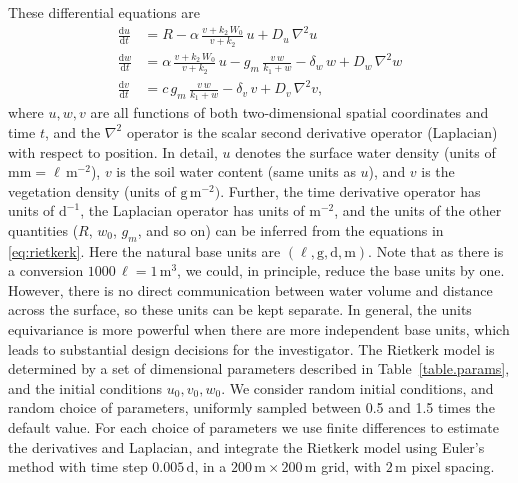 \documentclass[twoside,11pt]{article}
\newcommand{\dd}{\mathrm{d}}
\newcommand{\unit}[1]{\mathrm{#1}}
\newcommand{\g}{\unit{g}}
\newcommand{\m}{\unit{m}}
\newcommand{\mm}{\unit{mm}}
\renewcommand{\l}{\unit{\ell}}
\renewcommand{\d}{\unit{d}}
\begin{document}
These differential equations are
\begin{align}\label{eq:rietkerk}
    \frac{\dd u}{\dd t} &= R - \alpha\,\frac{v + k_2\,W_0}{v + k_2}\,u + D_u\,\nabla^2 u\nonumber\\
    \frac{\dd w}{\dd t} &= \alpha\,\frac{v + k_2\,W_0}{v + k_2}\,u - g_m\,\frac{v\,w}{k_1 + w} - \delta_w\,w + D_w\,\nabla^2 w\nonumber\\
    \frac{\dd v}{\dd t} &= c\,g_m\,\frac{v\,w}{k_1 + w} - \delta_v\,v + D_v\,\nabla^2 v,
\end{align}
where $u,w,v$ are all functions of both two-dimensional spatial coordinates and time $t$, and the $\nabla^2$ operator is the scalar second derivative operator (Laplacian) with respect to position.
In detail, $u$ denotes the surface water density (units of $\mm = \l\,\m^{-2}$), $v$ is the soil water content (same units as $u$), and $v$ is the vegetation density (units of $\g\,\m^{-2})$. Further, the time derivative operator has units of $\d^{-1}$, the Laplacian operator has units of $\m^{-2}$, and the units of the other quantities ($R$, $w_0$, $g_m$, and so on) can be inferred from the equations in \eqref{eq:rietkerk}.
Here the natural base units are $(\l, \g, \d, \m)$.
Note that as there is a conversion $1000\,\l=1\,\m^3$,  we could, in principle, reduce the base units by one. However, there is no direct communication between water volume and distance across the surface, so these units can be kept separate.
In general, the units equivariance is more powerful when there are more independent base units, which leads to substantial design decisions for the investigator. The Rietkerk model is determined by a set of dimensional parameters described in Table~\ref{table.params}, and the initial conditions $u_0, v_0, w_0$. We consider random initial conditions, and random choice of parameters, uniformly sampled between 0.5 and 1.5 times the default value. For each choice of parameters we use finite differences to estimate the derivatives and Laplacian, and integrate the Rietkerk model using Euler's method with time step $0.005\, \d$, in a $200\,\m \times 200\, \m$ grid, with $2\,\m$ pixel spacing.
\end{document}
